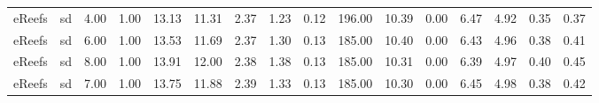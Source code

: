 \begin{table}[ht]
\begin{tabular}{llrrrrrrrrrrrrrr}
  eReefs & sd & 4.00 & 1.00 & 13.13 & 11.31 & 2.37 & 1.23 & 0.12 & 196.00 & 10.39 & 0.00 & 6.47 & 4.92 & 0.35 & 0.37 \\ 
  eReefs & sd & 6.00 & 1.00 & 13.53 & 11.69 & 2.37 & 1.30 & 0.13 & 185.00 & 10.40 & 0.00 & 6.43 & 4.96 & 0.38 & 0.41 \\ 
  eReefs & sd & 8.00 & 1.00 & 13.91 & 12.00 & 2.38 & 1.38 & 0.13 & 185.00 & 10.31 & 0.00 & 6.39 & 4.97 & 0.40 & 0.45 \\ 
  eReefs & sd & 7.00 & 1.00 & 13.75 & 11.88 & 2.39 & 1.33 & 0.13 & 185.00 & 10.30 & 0.00 & 6.45 & 4.98 & 0.38 & 0.42 \\ 
   \bottomrule
\end{tabular}
\endgroup
\end{table}
